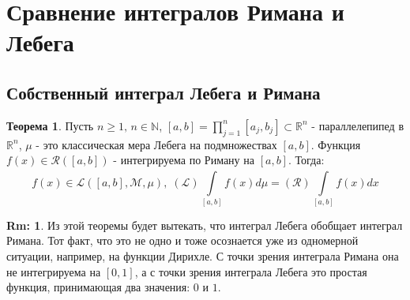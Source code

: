 \documentclass[12pt]{article}
\newcommand{\MR}{\mathbb{R}}
\newcommand{\MN}{\mathbb{N}}
\newcommand{\MCR}{\mathcal{R}}
\newcommand{\ML}{\mathcal{L}}
\newcommand{\MM}{\mathcal{M}}
\theoremstyle{definition}
\newtheorem{rem}{Rm:}
\newtheorem{theorem}{Теорема}
\newcommand{\ddint}[2]{\displaystyle\int\limits_{#1}^{#2}}
\begin{document}
\newpage
\section*{Сравнение интегралов Римана и Лебега}
\subsection*{Собственный интеграл Лебега и Римана}
\begin{theorem}
	Пусть $n \geq 1, \, n \in \MN$, $[a,b] = \prod\limits_{j = 1}^{n}[a_j, b_j] \subset \MR^n$ - параллелепипед в $\MR^n$, $\mu$ - это классическая мера Лебега на подмножествах $[a,b]$. Функция $f(x) \in \MCR([a,b])$ - интегрируема по Риману на $[a,b]$. Тогда: 
	$$
		f(x) \in \ML([a,b], \MM, \mu), \; (\ML) \ddint{[a,b]}{}f(x) d\mu = (\MCR) \ddint{[a,b]}{}f(x)dx
	$$
\end{theorem}
\begin{rem}
	Из этой теоремы будет вытекать, что интеграл Лебега обобщает интеграл Римана. Тот факт, что это не одно и тоже осознается уже из одномерной ситуации, например, на функции Дирихле. С точки зрения интеграла Римана она не интегрируема на $[0,1]$, а с точки зрения интеграла Лебега это простая функция, принимающая два значения: $0$ и $1$.
\end{rem}
\end{document}
